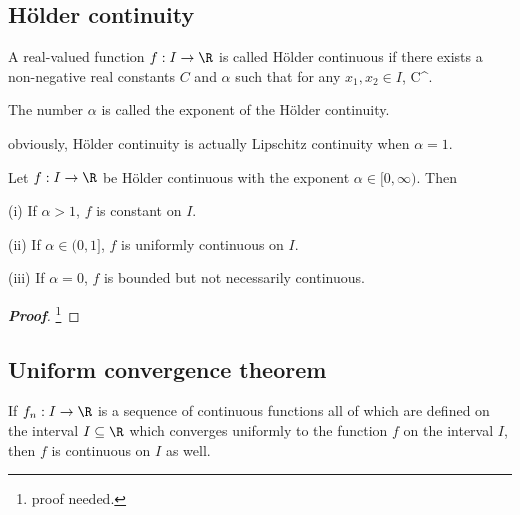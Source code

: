 \subsection{H\"older continuity}


\begin{definition}
A real-valued function $f:I\to \R$ is called H\"older continuous if there exists a non-negative real constants $C$ and $\alpha$ such that for any $x_1,x_2\in I$,
\be
{} \leq C^\alpha.
\ee

The number $\alpha$ is called the exponent of the H\"older continuity.
\end{definition}

\begin{remark}
obviously, H\"older continuity is actually Lipschitz continuity when $\alpha =1$.
\end{remark}

%

\begin{theorem}
Let $f:I\to \R$ be H\"older continuous with the exponent $\alpha\in [0,\infty)$. Then
\ben
\item [(i)] If $\alpha>1$, $f$ is constant on $I$.
\item [(ii)] If $\alpha\in (0,1]$, $f$ is uniformly continuous on $I$.
\item [(iii)] If $\alpha = 0$, $f$ is bounded but not necessarily continuous.
\een
\end{theorem}

\begin{proof}[\bf Proof]
\footnote{proof needed.}
\end{proof}

\subsection{Uniform convergence theorem}

\begin{theorem}\label{thm:uniform_convergence_continuous_real}
If $f_n:I\to \R$ is a sequence of continuous functions all of which are defined on the interval $I\subseteq \R$ which converges uniformly to the function $f$ on the interval $I$, then $f$ is continuous on $I$ as well.
\end{theorem}

